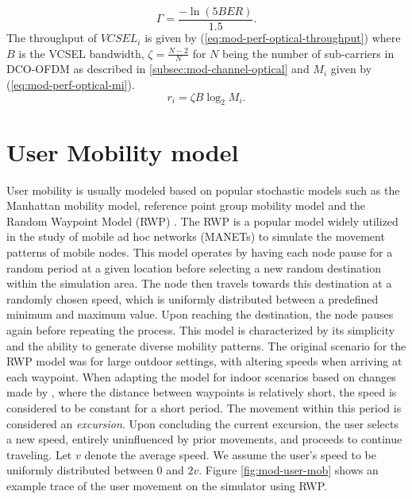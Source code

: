 \begin{equation}
    \Gamma = \frac{-\ln{(5{BER})}}{1.5}.
    \label{eq:mod-perf-optical-SINR gap}
\end{equation}
The throughput of ${VCSEL_i}$ is given by (\ref{eq:mod-perf-optical-throughput}) where $B$ is the VCSEL bandwidth, $\zeta = \frac{N-2}{N}$ for $N$ being the number of sub-carriers in DCO-OFDM as described in \ref{subsec:mod-channel-optical} and $M_i$ given by (\ref{eq:mod-perf-optical-mi}).
\begin{equation}
    r_i = \zeta B \log_2M_i.
    \label{eq:mod-perf-optical-throughput}
\end{equation}
\section{User Mobility model}
\label{sec:mod-usr-mob}
User mobility is usually modeled based on popular stochastic models such as the Manhattan mobility model, reference point group mobility model \cite{kahn_experimental_1995} and the Random Waypoint Model (RWP) \cite{imielinski_dynamic_1996}. The RWP is a popular model widely utilized in the study of mobile ad hoc networks (MANETs) to simulate the movement patterns of mobile nodes. This model operates by having each node pause for a random period at a given location before selecting a new random destination within the simulation area. The node then travels towards this destination at a randomly chosen speed, which is uniformly distributed between a predefined minimum and maximum value. Upon reaching the destination, the node pauses again before repeating the process. This model is characterized by its simplicity and the ability to generate diverse mobility patterns. The original scenario for the RWP model was for large outdoor settings, with altering speeds when arriving at each waypoint. When adapting the model for indoor scenarios based on changes made by \cite{wu_smart_2020}, where the distance between waypoints is relatively short, the speed is considered to be constant for a short period. The movement within this period is considered an \textit{excursion}. Upon concluding the current excursion, the user selects a new speed, entirely uninfluenced by prior movements, and proceeds to continue traveling. Let $v$ denote the average speed. We assume the user's speed to be uniformly distributed between $0$ and $2v$. Figure \ref{fig:mod-user-mob} shows an example trace of the user movement on the simulator using RWP.
